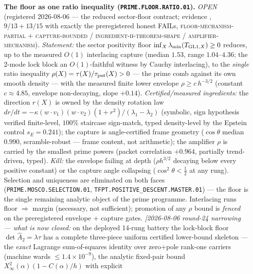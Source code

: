 \par\smallskip\noindent\textbf{The floor as one ratio inequality
(\texttt{PRIME.FLOOR.RATIO.01}).}
{\sloppy
\emph{OPEN} (registered 2026-08-06 --- the reduced sector-floor
contract; evidence , $9/13 +
13/15$ with exactly the preregistered honest FAILs,
\textsc{floor-mechanism-partial} $+$ \textsc{capture-bounded} /
\textsc{ingredient-ii-theorem-shape} /
\textsc{amplifier-mechanism}).  \emph{Statement:} the sector
positivity floor $\inf_X\lambda_{\min}(T_{{\rm GL1},X})\ge0$
reduces, up to the measured $O(1)$ interlacing capture (median
$1.53$, range $1.04$--$4.36$; the 2-mode lock block an
$O(1)$-faithful witness by Cauchy interlacing), to the
\emph{single} ratio inequality
$\rho(X)=\tau(X)/\tau_{\rm pnt}(X)>0$ --- the prime comb against
its own smooth density --- with the measured finite lower
envelope $\rho\ge c\,h^{-3/2}$ (constant $c\approx4.85$, envelope
non-decaying, slope $+0.14$).  \emph{Certified/measured
ingredients:} the direction $r(X)$ is owned by the density
rotation law $dr/dt=-\kappa(w\!\cdot\!v_1)(w\!\cdot\!v_2)
(1+r^2)/(\lambda_1-\lambda_2)$ (symbolic, sign hypothesis
verified finite-level, $100\%$ staircase sign-match, typed
density-level by the Epstein control $s_E=0.241$); the capture is
angle-certified frame geometry ($\cos\theta$ median $0.990$,
scramble-robust --- frame content, not arithmetic); the amplifier
$\rho$ is carried by the smallest prime powers (packet
correlation $+0.964$, partially trend-driven, typed).
\emph{Kill:} the envelope failing at depth ($\rho h^{3/2}$
decaying below every positive constant) or the capture angle
collapsing ($\cos^2\theta<\tfrac12$ at any rung).  Selection and
uniqueness are eliminated on both faces
(\texttt{PRIME.MOSCO.SELECTION.01},
\texttt{TFPT.POSITIVE\_DESCENT.MASTER.01}) --- the floor is the
single remaining analytic object of the prime programme.
Interlacing runs floor $\Rightarrow$ margin (necessary, not
sufficient); promotion of any $\rho$ bound is
\emph{fenced} on the preregistered envelope $+$ capture gates.
\emph{[2026-08-06 round-24 narrowing --- what is now closed:} on
the deployed 14-rung battery the lock-block floor $\det\hat A_2 =
\lambda\tau$ has a complete three-piece uniform certified
lower-bound skeleton --- the \emph{exact} Lagrange sum-of-squares
identity over zero$+$pole rank-one carriers (machine wards
$\le1.4\times10^{-9}$), the analytic fixed-pair bound
$X_\infty^2(\alpha)(1 - C(\alpha)/h)$ with explicit
}
